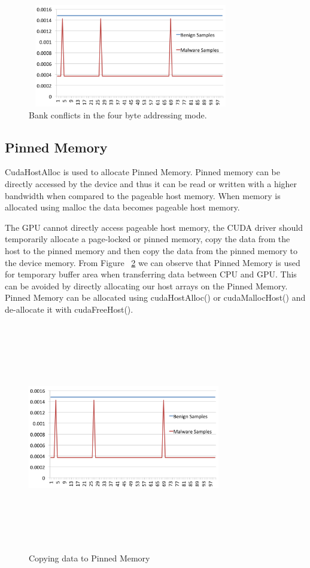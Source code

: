 \begin{figure}
	\centering
	\includegraphics[width=9cm, height=4.5cm]{500.png}
	\caption{Bank conflicts in the four byte addressing mode\cite{bib2}.}
	\label{fig:bankconflicts}
\end{figure}

\subsection{Pinned Memory}
CudaHostAlloc is used to allocate Pinned Memory. Pinned memory can be directly accessed by the device and thus it can be read or written with a higher bandwidth when compared to the pageable host memory. When memory is allocated using malloc the data becomes pageable host memory.

The GPU cannot directly access pageable host memory, the CUDA driver should temporarily allocate a page-locked or pinned memory, copy the data from the host to the pinned memory and then copy the data from the pinned memory to the device memory. From Figure ~\ref{fig:packetpinnedmemory} we can observe that Pinned Memory is used for temporary buffer area when transferring data between CPU and GPU. This can be avoided by directly allocating our host arrays on the Pinned Memory. Pinned Memory can be allocated using cudaHostAlloc() or cudaMallocHost() and de-allocate it with cudaFreeHost().

\begin{figure}
	\centering
	\includegraphics[width=8.4cm, height=10cm]{500.png}
	\caption{Copying data to Pinned Memory \cite{bib3}}
	\label{fig:packetpinnedmemory}
\end{figure}

